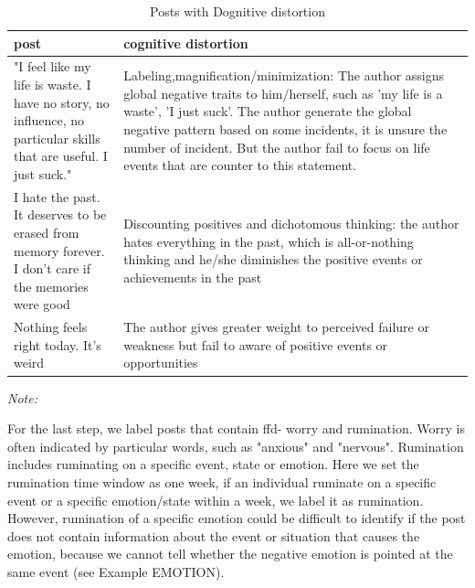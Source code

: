\begin{table}%
\caption{Posts with Dognitive distortion}
\label{tab:zero}
\begin{minipage}{\columnwidth}
\begin{center}
\begin{tabular}{|p{5cm}|p{9.5cm}|}
  \toprule
         post	& cognitive distortion   \\ 

  \hline\hline
  "I feel like my life is waste. I have no story, no influence, no particular skills that are useful. I just suck."
 & Labeling,magnification/minimization: The author assigns global negative traits to him/herself, such as 'my life is a waste',  'I just suck'. The author generate the global negative pattern based on some incidents, it is unsure the number of incident. But the author fail to focus on life events that are counter to this statement.  \\[5pt]
 \hline
  I hate the past. It deserves to be erased from memory forever. I don't care if the memories were good  &    Discounting positives and dichotomous thinking: the author hates everything in the past, which is all-or-nothing thinking and he/she diminishes the positive events or achievements in the past  \\[5pt]
  \hline
Nothing feels right today. It's weird  & The author gives greater weight to perceived failure or weakness but fail to aware of positive events or opportunities  \\[5pt]
  \bottomrule
\end{tabular}
\end{center}
\bigskip\centering

 \emph{Note:} 
\end{minipage}
\end{table}%

For the last step, we label posts that contain 
ffd- worry and rumination. Worry is often indicated by particular words, such as "anxious" and "nervous". Rumination includes ruminating on a specific event, state or emotion. Here we set the rumination time window as one week, if an individual ruminate on a specific event or a specific emotion/state within a week, we label it as rumination. However, rumination of a specific emotion could be difficult to identify if the post does not contain information about the event or situation that causes the emotion, because we cannot tell whether the negative emotion is pointed at the same event (see Example EMOTION).

